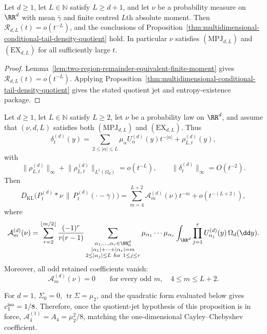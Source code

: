 \begin{theorem}%
\label{thm:multidimensional-density-quotient}
Let \(d\ge1\), let \(L\in\mathbb N\) satisfy \(L\ge d+1\), and let \(\nu\) be
a probability measure on \(\RR^d\) with mean \(\bar{\gamma}\) and finite
centred \(L\)th absolute moment.  Then
\(\mathcal R_{d,L}(t)=o(t^{-L})\), and the conclusions of
Proposition~\ref{thm:multidimensional-conditional-tail-density-quotient}
hold.
In particular \(\nu\) satisfies \((\mathrm{MPJ}_{d,L})\) and
\((\mathrm{EX}_{d,L})\) for all sufficiently large \(t\).
\end{theorem}

\begin{proof}
Lemma~\ref{lem:two-region-remainder-equivalent-finite-moment} gives
\(\mathcal R_{d,L}(t)=o(t^{-L})\).  Applying
Proposition~\ref{thm:multidimensional-conditional-tail-density-quotient} gives
the stated quotient jet and entropy-existence package.
\end{proof}

\begin{proposition}%
\label{thm:multidimensional-poisson-entropy-jets}
Let \(d\ge1\), let \(L\in\mathbb N\) satisfy \(L\ge2\), let \(\nu\) be a
probability law on \(\RR^d\), and assume that \((\nu,d,L)\) satisfies both
\((\mathrm{MPJ}_{d,L})\) and \((\mathrm{EX}_{d,L})\).  Thus
\[
\delta_t^{(d)}(y)
=\sum_{2\le\lvert\alpha\rvert\le L}
\mu_\alpha U_\alpha^{(d)}(y)t^{-\lvert\alpha\rvert}
+\rho_{L,t}^{(d)}(y),
\]
with
\[
\lVert\rho_{L,t}^{(d)}\rVert_\infty+
\lVert\rho_{L,t}^{(d)}\rVert_{L^1(\Omega_d)}=o(t^{-L}),
\qquad
\lVert\delta_t^{(d)}\rVert_\infty=O(t^{-2}).
\]
Then
\[
D_{\mathrm{KL}}\bigl(P_t^{(d)}*\nu\,\|\,P_t^{(d)}(\cdot-\bar{\gamma})\bigr)
=\sum_{m=4}^{L+2}\mathcal A_m^{(d)}(\nu)t^{-m}
+o(t^{-(L+2)}),
\]
where
\[
\mathcal A_m^{(d)}(\nu)=
\sum_{r=2}^{\lfloor m/2\rfloor}
\frac{(-1)^r}{r(r-1)}
\sum_{\substack{\alpha_1,\ldots,\alpha_r\in\NN_0^d\\
|\alpha_1|+\cdots+|\alpha_r|=m\\
2\le|\alpha_j|\le L\ \mathrm{for}\ 1\le j\le r}}
\mu_{\alpha_1}\cdots\mu_{\alpha_r}
\int_{\RR^d}\prod_{j=1}^r
U_{\alpha_j}^{(d)}(y)\,\Omega_d(\dd y).
\]
Moreover, all odd retained coefficients vanish:
\[
\mathcal A_m^{(d)}(\nu)=0
\qquad\text{for every odd }m,\quad 4\le m\le L+2.
\]
\end{proposition}

\begin{remark}
For \(d=1\), \(\Sigma_0=0\), \(\operatorname{tr}\Sigma=\mu_2\), and the
quadratic form evaluated below gives \(c_1^{\rm iso}=1/8\).  Therefore, once
the quotient-jet hypothesis of this proposition is in force,
\(\mathcal A_4^{(1)}=A_4=\mu_2^2/8\), matching the one-dimensional
Cayley--Chebyshev coefficient.
\end{remark}

